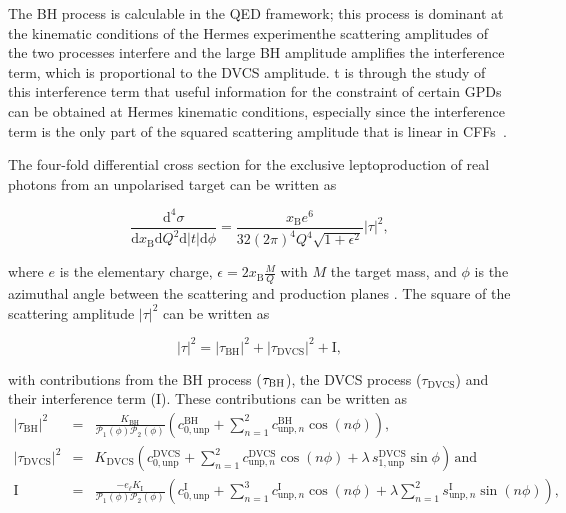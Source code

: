 The BH process is calculable in the QED framework; this process is
dominant at the kinematic conditions of the H{\sc ermes} experimenthe
scattering amplitudes of the two processes interfere and the large BH amplitude
amplifies the interference term, which is proportional to the DVCS amplitude. t is through the study of this interference term that useful information for the constraint of certain GPDs can be obtained at H{\sc ermes} kinematic conditions, especially since the interference term is the only part of the squared scattering amplitude that is linear in CFFs~\cite{Bel02b}.

The four-fold differential cross section for the exclusive leptoproduction of real photons
from an unpolarised  target can be written as \cite{Bel02b}
\begin{center}
\begin{equation}
\frac{\textrm{d}^4\sigma}{\textrm{d}x_{\textrm{B}}\textrm{d}Q^{2}\textrm{d}
|t|\textrm{d}\phi} =
\frac{x_{\textrm{B}}e^{6}}{32(2\pi)^{4} Q^{4}\sqrt{1+\epsilon^{2}}}
|\tau|^{2},
\end{equation}
\end{center}
where $e$ is the elementary
charge, $\epsilon=2x_\textrm{B}\frac{M}{Q}$ with $M$
the target mass, and $\phi$ is the
azimuthal angle between the scattering and production planes \cite{Tre04}.
The {square of the} scattering amplitude $|\tau|^2$ can be written as
\begin{center}
\begin{equation}
|\tau|^{2} = |\tau_{\textrm{BH}}|^{2} +
|\tau_{\textrm{DVCS}}|^{2} + \textrm{I},
\end{equation}
\end{center}
with contributions from the \textrm{BH} process ($\tau_{\textrm{\textrm{BH}}}$),
the DVCS process
($\tau_{\textrm{DVCS}}$) and their interference term (I). These
contributions can be written as
\begin{eqnarray}
 |\tau_{\textrm{BH}}|^{2} &=&
 \frac{K_{\textrm{BH}}}{\mathcal{P}_{1}(\phi)\mathcal{P}_{2}(\phi)} \left(c_{0,\textrm{unp}}^{\textrm{BH}} + \sum_{n=1}^2
  c_{\textrm{unp},n}^{\textrm{BH}}\cos(n\phi)\right), \label{e:tbh}\\
|\tau_{\textrm{DVCS}}|^{2} &=&
K_{\textrm{DVCS}}\left(c_{0,\textrm{unp}}^{\textrm{DVCS}} +
\sum_{n=1}^2
c_{\textrm{unp},n}^{\textrm{DVCS}}\cos(n\phi) + \lambda\,
s_{1,\textrm{unp}}^{\textrm{DVCS}}\sin\phi\right)\,\textrm{and}
\label{e:tdvcs}\\
 \textrm{I} &=& \frac{- e_\ell
K_{\textrm{I}}}{\mathcal{P}_{1}(\phi)\mathcal{P}_{2}(\phi)}\left(c_{0,\textrm{unp}}^{\textrm{
I}}+
\sum_{n=1}^3 c_{\textrm{unp},n}^{\textrm{I}}\cos(n\phi) + \lambda \sum_{n=1}^2
s_{\textrm{unp},n}^{\textrm{I}}\sin(n\phi)\right),\label{e:ti}
\end{eqnarray}
